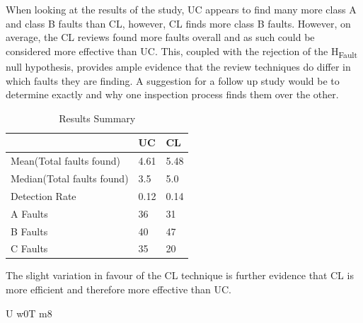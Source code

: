 \documentclass[10pt,twocolumn]{article}
\begin{document}
When looking at the results of the study, UC appears to find many more class A and class B faults than CL, however, CL finds more class B faults. However, on average, the CL reviews found more faults overall and as such could be considered more effective than UC. This, coupled with the rejection of the H\textsubscript{Fault} null hypothesis, provides ample evidence that the review techniques do differ in which faults they are finding. A suggestion for a follow up study would be to determine exactly  and why one inspection process finds them over the other.

\begin{table}
	\centering
	\begin{tabular}[Ht]{|l|l|l|}
	\hline
	& UC & CL \\
	\hline
	Mean(Total faults found) & 4.61 & 5.48 \\
	\hline
	Median(Total faults found) & 3.5 & 5.0 \\
	\hline
	Detection Rate & 0.12 & 0.14 \\
	\hline
	A Faults & 36 & 31 \\
	\hline
	B Faults & 40 & 47 \\
	\hline
	C Faults & 35 & 20 \\
	\hline
	\end{tabular}
	\caption{Results Summary}
\end{table}





The slight variation in favour of the CL technique is further evidence that CL is more efficient and therefore more effective than UC.








U w0T m8
\end{document}

